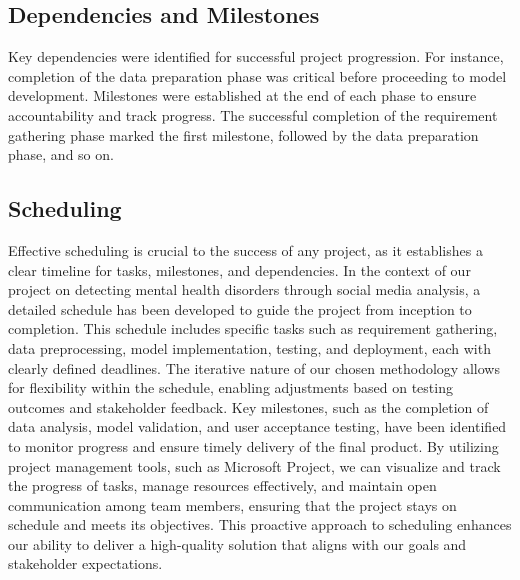 \subsection{Dependencies and Milestones} 
\noindent
Key dependencies were identified for successful project progression. For instance, completion of the data preparation phase was critical before proceeding to model development. Milestones were established at the end of each phase to ensure accountability and track progress. The successful completion of the requirement gathering phase marked the first milestone, followed by the data preparation phase, and so on.

\subsection{Scheduling}
\noindent
Effective scheduling is crucial to the success of any project, as it establishes a clear timeline for tasks, milestones, and dependencies. In the context of our project on detecting mental health disorders through social media analysis, a detailed schedule has been developed to guide the project from inception to completion. This schedule includes specific tasks such as requirement gathering, data preprocessing, model implementation, testing, and deployment, each with clearly defined deadlines. The iterative nature of our chosen methodology allows for flexibility within the schedule, enabling adjustments based on testing outcomes and stakeholder feedback. Key milestones, such as the completion of data analysis, model validation, and user acceptance testing, have been identified to monitor progress and ensure timely delivery of the final product. By utilizing project management tools, such as Microsoft Project, we can visualize and track the progress of tasks, manage resources effectively, and maintain open communication among team members, ensuring that the project stays on schedule and meets its objectives. This proactive approach to scheduling enhances our ability to deliver a high-quality solution that aligns with our goals and stakeholder expectations.

\pagebreak

